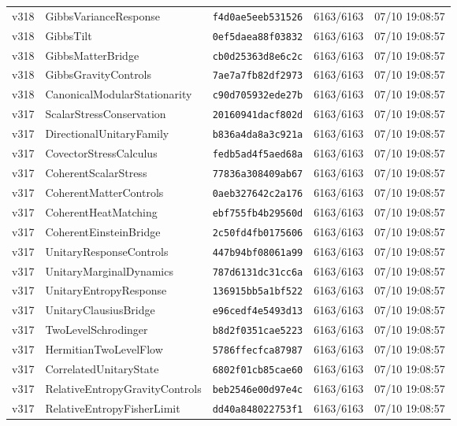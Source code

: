 \documentclass[11pt]{article}
\theoremstyle{definition}\newtheorem{deriv}{Derivation}
\begin{document}
{\begin{longtable}{@{}lllll@{}}
v318 & GibbsVarianceResponse & \texttt{f4d0ae5eeb531526} & 6163/6163 & 07/10 19:08:57 \\
v318 & GibbsTilt & \texttt{0ef5daea88f03832} & 6163/6163 & 07/10 19:08:57 \\
v318 & GibbsMatterBridge & \texttt{cb0d25363d8e6c2c} & 6163/6163 & 07/10 19:08:57 \\
v318 & GibbsGravityControls & \texttt{7ae7a7fb82df2973} & 6163/6163 & 07/10 19:08:57 \\
v318 & CanonicalModularStationarity & \texttt{c90d705932ede27b} & 6163/6163 & 07/10 19:08:57 \\
v317 & ScalarStressConservation & \texttt{20160941dacf802d} & 6163/6163 & 07/10 19:08:57 \\
v317 & DirectionalUnitaryFamily & \texttt{b836a4da8a3c921a} & 6163/6163 & 07/10 19:08:57 \\
v317 & CovectorStressCalculus & \texttt{fedb5ad4f5aed68a} & 6163/6163 & 07/10 19:08:57 \\
v317 & CoherentScalarStress & \texttt{77836a308409ab67} & 6163/6163 & 07/10 19:08:57 \\
v317 & CoherentMatterControls & \texttt{0aeb327642c2a176} & 6163/6163 & 07/10 19:08:57 \\
v317 & CoherentHeatMatching & \texttt{ebf755fb4b29560d} & 6163/6163 & 07/10 19:08:57 \\
v317 & CoherentEinsteinBridge & \texttt{2c50fd4fb0175606} & 6163/6163 & 07/10 19:08:57 \\
v317 & UnitaryResponseControls & \texttt{447b94bf08061a99} & 6163/6163 & 07/10 19:08:57 \\
v317 & UnitaryMarginalDynamics & \texttt{787d6131dc31cc6a} & 6163/6163 & 07/10 19:08:57 \\
v317 & UnitaryEntropyResponse & \texttt{136915bb5a1bf522} & 6163/6163 & 07/10 19:08:57 \\
v317 & UnitaryClausiusBridge & \texttt{e96cedf4e5493d13} & 6163/6163 & 07/10 19:08:57 \\
v317 & TwoLevelSchrodinger & \texttt{b8d2f0351cae5223} & 6163/6163 & 07/10 19:08:57 \\
v317 & HermitianTwoLevelFlow & \texttt{5786ffecfca87987} & 6163/6163 & 07/10 19:08:57 \\
v317 & CorrelatedUnitaryState & \texttt{6802f01cb85cae60} & 6163/6163 & 07/10 19:08:57 \\
v317 & RelativeEntropyGravityControls & \texttt{beb2546e00d97e4c} & 6163/6163 & 07/10 19:08:57 \\
v317 & RelativeEntropyFisherLimit & \texttt{dd40a848022753f1} & 6163/6163 & 07/10 19:08:57 \\

\end{longtable}}
\end{document}
